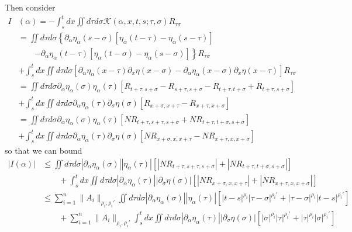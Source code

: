 \documentclass[a4paper,12pt,reqno]{amsproc}
\newcommand{\NN}{N}
\begin{document}
Then consider
\begin{equation*}
  \begin{split}
 I&(\alpha)  =
 - \int_s^t dx \iint d\tau d\sigma
 \mathcal{K}(\alpha,x,t,s;\tau,\sigma) R_{\tau \sigma} 
\\ & =
  \iint d\tau d\sigma \left\{\partial_\alpha \eta_\alpha(s-\sigma)
 [\eta_\alpha(t-\tau)-\eta_\alpha(s-\tau)] \right.\\ & \qquad \left. -
 \partial_\alpha \eta_\alpha(t-\tau)
 [\eta_\alpha(t-\sigma)-\eta_\alpha(s-\sigma)]\right\} R_{\tau \sigma} 
\\ & 
 + \int_s^t dx \iint d\tau d\sigma
[\partial_\alpha \eta_\alpha(x-\tau) \partial_x \eta(x-\sigma) -
 \partial_\alpha \eta_\alpha(x-\sigma) \partial_x \eta(x-\tau)]
 R_{\tau \sigma}
\\ & = 
  \iint d\tau d\sigma \partial_\alpha \eta_\alpha(\sigma)
 \eta_\alpha(\tau) [R_{t+\tau,s+\sigma }-R_{s+\tau,s+\sigma }-R_{t+\tau,t+\sigma}+R_{t+\tau,s+\sigma} ]
\\ & 
 + \int_s^t dx \iint d\tau d\sigma
\partial_\alpha \eta_\alpha(\tau) \partial_\sigma \eta(\sigma) 
 [R_{x+\sigma,x+\tau}-R_{x+\tau,x+\sigma}]
\\ & = 
  \iint d\tau d\sigma \partial_\alpha \eta_\alpha(\sigma)
 \eta_\alpha(\tau) [\NN R_{t+\tau,s+\tau,s+\sigma }+\NN R_{t+\tau,t+\sigma,s+\sigma} ]
\\ & 
 + \int_s^t dx \iint d\tau d\sigma
\partial_\alpha \eta_\alpha(\tau) \partial_\sigma \eta(\sigma) 
 [\NN R_{x+\sigma,x,x+\tau}-\NN R_{x+\tau,x,x+\sigma}]
  \end{split}
\end{equation*}
so that we can bound
\begin{equation*}
  \begin{split}
  |I(\alpha)| & \le     
  \iint d\tau d\sigma |\partial_\alpha \eta_\alpha(\sigma)|
 |\eta_\alpha(\tau)| \left[|\NN R_{t+\tau,s+\tau,s+\sigma }|+|\NN R_{t+\tau,t+\sigma,s+\sigma}| \right]
\\ & 
 \qquad + \int_s^t dx \iint d\tau d\sigma
|\partial_\alpha \eta_\alpha(\tau)|| \partial_\sigma \eta(\sigma)| 
 \left[|\NN R_{x+\sigma,x,x+\tau}|+|\NN R_{x+\tau,x,x+\sigma}|\right]
\\ & \le     \sum_{i=1}^n \|A_i\|_{\rho_i,\rho_i'}
  \iint d\tau d\sigma |\partial_\alpha \eta_\alpha(\sigma)|
 |\eta_\alpha(\tau)| \left[|t-s|^{\rho_i} |\tau-\sigma|^{\rho_i'}
+|\tau-\sigma|^{\rho_i} |t-s|^{\rho_i'}  \right]
\\ & 
 \qquad +    \sum_{i=1}^n \|A_i\|_{\rho_i,\rho_i'} \int_s^t dx \iint d\tau d\sigma
|\partial_\alpha \eta_\alpha(\tau)|| \partial_\sigma \eta(\sigma)| 
 \left[|\sigma|^{\rho_i} |\tau|^{\rho_i'}+|\tau|^{\rho_i} |\sigma|^{\rho_i'}\right]
  \end{split}
\end{equation*}
\end{document}
